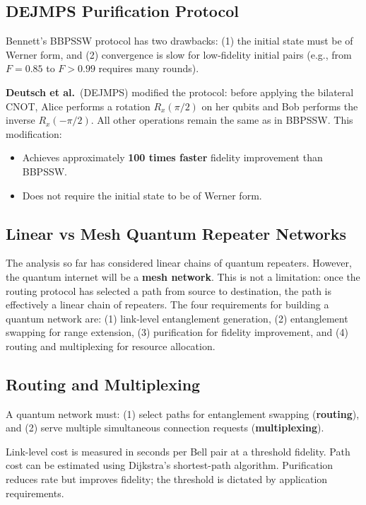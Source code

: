\documentclass[10pt,a4paper]{article}
\begin{document}
\subsection{DEJMPS Purification Protocol}

Bennett's BBPSSW protocol has two drawbacks: (1) the initial state must be of Werner form, and (2) convergence is slow for low-fidelity initial pairs (e.g., from $F=0.85$ to $F>0.99$ requires many rounds).

\textbf{Deutsch et al.}\ (DEJMPS) modified the protocol: before applying the bilateral CNOT, Alice performs a rotation $R_x(\pi/2)$ on her qubits and Bob performs the inverse $R_x(-\pi/2)$. All other operations remain the same as in BBPSSW. This modification:
\begin{itemize}[nosep]
\item Achieves approximately \textbf{100 times faster} fidelity improvement than BBPSSW.
\item Does not require the initial state to be of Werner form.
\end{itemize}

\subsection{Linear vs Mesh Quantum Repeater Networks}

The analysis so far has considered linear chains of quantum repeaters. However, the quantum internet will be a \textbf{mesh network}. This is not a limitation: once the routing protocol has selected a path from source to destination, the path is effectively a linear chain of repeaters. The four requirements for building a quantum network are: (1) link-level entanglement generation, (2) entanglement swapping for range extension, (3) purification for fidelity improvement, and (4) routing and multiplexing for resource allocation.

\subsection{Routing and Multiplexing}

A quantum network must: (1) select paths for entanglement swapping (\textbf{routing}), and (2) serve multiple simultaneous connection requests (\textbf{multiplexing}).

Link-level cost is measured in seconds per Bell pair at a threshold fidelity. Path cost can be estimated using Dijkstra's shortest-path algorithm. Purification reduces rate but improves fidelity; the threshold is dictated by application requirements.
\end{document}
